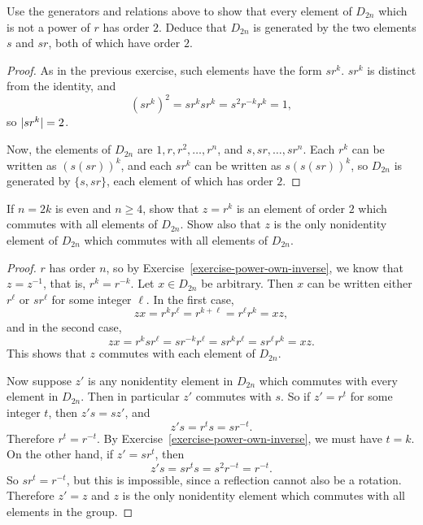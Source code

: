  Use the generators and relations above to show that every
element of $D_{2n}$ which is not a power of $r$ has order $2$. Deduce
that $D_{2n}$ is generated by the two elements $s$ and $sr$, both of
which have order $2$.
\label{exercise-dihedral-gen}
\begin{proof}
  As in the previous exercise, such elements have the form
  $sr^k$. $sr^k$ is distinct from the identity, and
  \begin{equation*}
    (sr^k)^2 = sr^ksr^k = s^2r^{-k}r^k = 1,
  \end{equation*}
  so $\lvert{sr^k}\rvert = 2$.

  Now, the elements of $D_{2n}$ are $1, r, r^2, \dots, r^n$, and
  $s, sr, \dots, sr^n$. Each $r^k$ can be written as $(s(sr))^k$, and
  each $sr^k$ can be written as $s(s(sr))^k$, so $D_{2n}$ is generated
  by $\{ s, sr \}$, each element of which has order $2$.
\end{proof}

 If $n = 2k$ is even and $n\geq4$, show that $z = r^k$ is an
element of order $2$ which commutes with all elements of
$D_{2n}$. Show also that $z$ is the only nonidentity element of
$D_{2n}$ which commutes with all elements of $D_{2n}$.
\begin{proof}
  $r$ has order $n$, so by Exercise~\ref{exercise-power-own-inverse},
  we know that $z = z^{-1}$, that is, $r^k = r^{-k}$. Let
  $x\in D_{2n}$ be arbitrary. Then $x$ can be written either $r^\ell$
  or $sr^\ell$ for some integer $\ell$. In the first case,
  \begin{equation*}
    zx = r^kr^\ell = r^{k+\ell} = r^\ell r^k = xz,
  \end{equation*}
  and in the second case,
  \begin{equation*}
    zx = r^ksr^\ell = sr^{-k}r^\ell = sr^kr^\ell = sr^\ell r^k = xz.
  \end{equation*}
  This shows that $z$ commutes with each element of $D_{2n}$.

  Now suppose $z'$ is any nonidentity element in $D_{2n}$ which
  commutes with every element in $D_{2n}$. Then in particular $z'$
  commutes with $s$. So if $z' = r^t$ for some integer $t$, then
  $z's = sz'$, and
  \begin{equation*}
    z's = r^ts = sr^{-t}.
  \end{equation*}
  Therefore $r^t = r^{-t}$. By
  Exercise~\ref{exercise-power-own-inverse}, we must have $t = k$. On
  the other hand, if $z' = sr^t$, then
  \begin{equation*}
    z's = sr^ts = s^2r^{-t} = r^{-t}.
  \end{equation*}
  So $sr^t = r^{-t}$, but this is impossible, since a reflection
  cannot also be a rotation. Therefore $z' = z$ and $z$ is the only
  nonidentity element which commutes with all elements in the group.
\end{proof}

